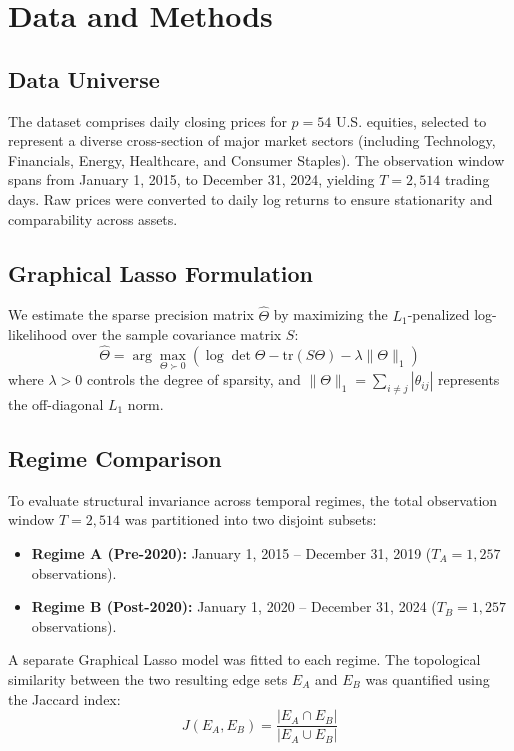 \documentclass[11pt]{article}
\begin{document}
\section{Data and Methods}
\subsection{Data Universe}
The dataset comprises daily closing prices for $p = 54$ U.S. equities, selected to represent a diverse cross-section of major market sectors (including Technology, Financials, Energy, Healthcare, and Consumer Staples). The observation window spans from January 1, 2015, to December 31, 2024, yielding $T = 2,514$ trading days. Raw prices were converted to daily log returns to ensure stationarity and comparability across assets.

\subsection{Graphical Lasso Formulation}
We estimate the sparse precision matrix $\hat{\Theta}$ by maximizing the $L_1$-penalized log-likelihood over the sample covariance matrix $S$:
\begin{equation}
\hat{\Theta} = \arg\max_{\Theta \succ 0} \left( \log \det \Theta - \text{tr}(S\Theta) - \lambda \|\Theta\|_1 \right)
\end{equation}
where $\lambda > 0$ controls the degree of sparsity, and $\|\Theta\|_1 = \sum_{i \neq j} |\theta_{ij}|$ represents the off-diagonal $L_1$ norm.

\subsection{Regime Comparison}
To evaluate structural invariance across temporal regimes, the total observation window $T = 2,514$ was partitioned into two disjoint subsets:
\begin{itemize}
    \item \textbf{Regime A (Pre-2020):} January 1, 2015 -- December 31, 2019 ($T_A = 1,257$ observations).
    \item \textbf{Regime B (Post-2020):} January 1, 2020 -- December 31, 2024 ($T_B = 1,257$ observations).
\end{itemize}
A separate Graphical Lasso model was fitted to each regime. The topological similarity between the two resulting edge sets $E_A$ and $E_B$ was quantified using the Jaccard index:
\begin{equation}
J(E_A, E_B) = \frac{|E_A \cap E_B|}{|E_A \cup E_B|}
\end{equation}
\end{document}
